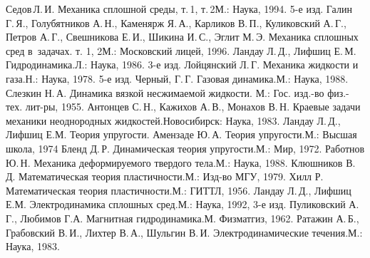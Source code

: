 \documentclass[a4paper,11pt]{article}
\begin{document}
\begin{thebibliography}{16}
\setlength\itemsep{-.5mm}
 Седов\,Л.\,И. Механика сплошной среды, т.\,1, т.\,2\т М.: Наука, 1994. 5-е изд.
 Галин Г.\,Я., Голубятников А.\,Н., Каменярж Я.\,А., Карликов В.\,П.,
Куликовский А.\,Г., Петров А.\,Г., Свешникова Е.\,И., Шикина И.\,С., Эглит М.\,Э. Механика сплошных сред
в~задачах. т. 1, 2\т М.: Московский лицей, 1996.
 Ландау Л.\,Д., Лифшиц Е.\,М. Гидродинамика.\т Л.: Наука, 1986. 3-е изд.
 Лойцянский Л.\,Г. Механика жидкости и газа.\т Н.: Наука, 1978. 5-е изд.
 Черный, Г.\,Г. Газовая динамика.\т М.: Наука, 1988.
 Слезкин Н.\,А. Динамика вязкой несжимаемой жидкости. М.: Гос. изд.-во физ.-тех. лит-ры, 1955.
 Антонцев С.\,Н., Кажихов А.\,В., Монахов В.\,Н.
Краевые задачи механики неоднородных жидкостей.\т Новосибирск: Наука, 1983.
 Ландау Л.\,Д., Лифшиц Е.М. Теория упругости.
 Амензаде Ю.\,А. Теория упругости.\т М.: Высшая школа, 1974
 Бленд Д.\,Р. Динамическая теория упругости.\т М.: Мир, 1972.
 Работнов Ю.\,Н. Механика деформируемого твердого тела.\т М.: Наука, 1988.
 Клюшников В.\,Д. Математическая теория пластичности.\т М.: Изд-во МГУ, 1979.
 Хилл Р. Математическая теория пластичности.\т М.: ГИТТЛ, 1956.
 Ландау Л.\,Д., Лифшиц Е.М. Электродинамика сплошных сред.\т М.: Наука, 1992, 3-е изд.
 Пуликовский А.\,Г., Любимов Г.А. Магнитная гидродинамика.\т М. Физматгиз, 1962.
 Ратажин А.\,Б., Грабовский В.\,И., Лихтер В.\,А., Шульгин В.\,И.
Электродинамические течения.\т М.: Наука, 1983.
\end{thebibliography}

\medskip\dmvntrail
\end{document}
